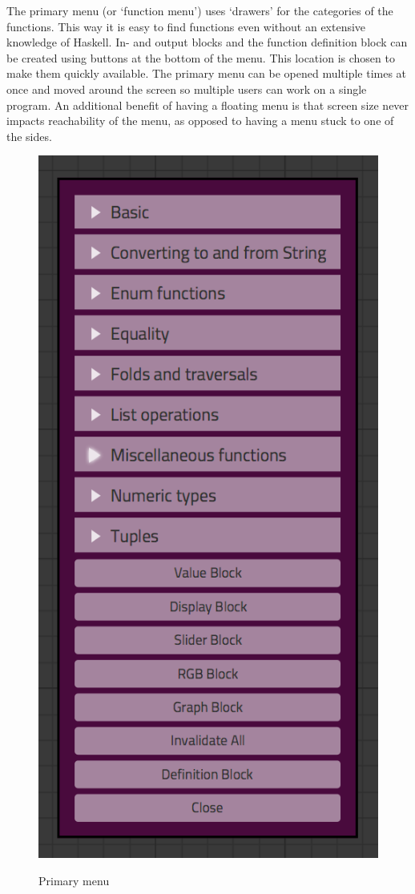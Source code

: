 The primary menu (or `function menu') uses `drawers' for the categories of the functions.  
This way it is easy to find functions even without an extensive knowledge of Haskell.
In- and output blocks and the function definition block can be created using buttons at the bottom of the menu.
This location is chosen to make them quickly available.
The primary menu can be opened multiple times at once and moved around the screen so multiple users can work on a single program. An additional benefit of having a floating menu is that screen size never impacts reachability of the menu, as opposed to having a menu stuck to one of the sides.

\begin{figure}[p]
	\centering
	\includegraphics[scale=0.5]{Images/menu}
	\label{fig:ui-menu}
	\caption{Primary menu}
\end{figure}


